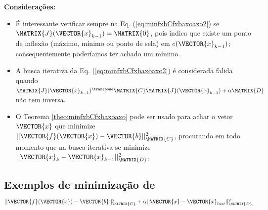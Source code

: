 \begin{theorem}
\textbf{Considerações:}

\begin{itemize}
\item É interessante verificar sempre na Eq. (\ref{eq:minfxbCfxbaxoaxo2}) 
se  $\MATRIX{J}(\VECTOR{x}_{k-1}) = \MATRIX{0}$,
pois indica que existe um ponto de inflexão 
(máximo, mínimo ou ponto de sela) em $e(\VECTOR{x}_{k-1})$;
consequentemente poderíamos ter achado um mínimo.
\item A busca iterativa da Eq. (\ref{eq:minfxbCfxbaxoaxo2}) é considerada falida quando 
$\MATRIX{J}(\VECTOR{x}_{k-1})^{\transpose}\MATRIX{C} \MATRIX{J}(\VECTOR{x}_{k-1}) +\alpha\MATRIX{D}$
não tem inversa.
\end{itemize}


\end{theorem} 


\begin{tcbattention}
\begin{itemize}
\item O Teorema \ref{theo:minfxbCfxbaxoaxo} pode ser usado para achar o vetor $\VECTOR{x}$
que minimize $||\VECTOR{f}(\VECTOR{x})-\VECTOR{b}||_{\MATRIX{C}}^2$, procurando 
em todo momento que na busca iterativa se minimize $||\VECTOR{x}_{k}-\VECTOR{x}_{k-1}||_{\MATRIX{D}}^2$,
\end{itemize}
\end{tcbattention}

\subsection{Exemplos de minimização de 
$||\VECTOR{f}(\VECTOR{x})-\VECTOR{b}||_{\MATRIX{C}}^2+\alpha||\VECTOR{x}-\VECTOR{x}_{last}||_{\MATRIX{D}}^2$}


